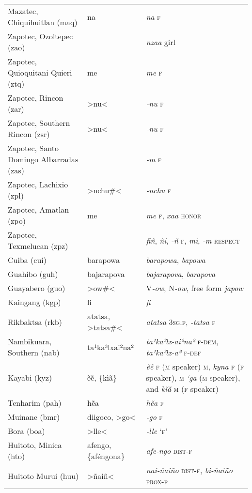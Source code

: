 {\begin{longtable}{L{.25\textwidth}L{.25\textwidth}L{.5\textwidth}}
Mazatec, Chiquihuitlan (maq)	&	na	&	\textit{na} \textsc{f}	\\
Zapotec, Ozoltepec (zao)	&		&	\textit{nzaa} girl	\\
Zapotec, Quioquitani Quieri (ztq)	&	me	&	\textit{me} \textsc{f}	\\
Zapotec, Rincon (zar)	&	>nu<	&	\textit{-nu} \textsc{f}	\\
Zapotec, Southern Rincon (zsr) 	&	>nu<	&	\textit{-nu} \textsc{f}	\\
Zapotec, Santo Domingo Albarradas (zas)	&		&	\textit{-m} \textsc{f}	\\
Zapotec, Lachixio (zpl)	&	>nchu\#<	&	\textit{-nchu} \textsc{f}	\\
Zapotec, Amatlan (zpo)	&	me	&	\textit{me} \textsc{f}, \textit{xaa} \textsc{honor}	\\
Zapotec, Texmelucan (zpz)	&		&	\textit{fiñ}, \textit{ñi}, \textit{-ñ} \textsc{f}, \textit{mi}, \textit{-m} \textsc{respect}	\\
Cuiba (cui)	&	barapowa	&	\textit{barapowa}, \textit{bapowa}	\\
Guahibo (guh)	&	bajarapova	&	\textit{bajarapova}, \textit{barapova}	\\
Guayabero (guo)	&	>ow\#<	&	V\textit{-ow}, N\textit{-ow}, free form \textit{japow}	\\
Kaingang (kgp)	&	fi	&	\textit{fi}	\\
Rikbaktsa (rkb)	&	atatsa, >tatsa\#<	&	\textit{atatsa} \textsc{3sg.f}, \textit{-tatsa} \textsc{f}	\\
Nambikuara, Southern (nab)	&	ta¹ka³lxai²na²	&	\textit{ta¹ka³lx-ai²na²} \textsc{f-dem}, \textit{ta¹ka³lx-a²} \textsc{f-def}	\\
Kayabi (kyz)	&	ẽẽ, \{kĩã\}	&	\textit{ẽẽ} \textsc{f} (\textsc{m} speaker) \textsc{m}, \textit{kyna} \textsc{f} (\textsc{f} speaker), \textsc{m} \textit{‘ga} (\textsc{m} speaker), and \textit{kĩã} \textsc{m} (\textsc{f} speaker)	\\
Tenharim (pah)	&	hẽa	&	\textit{hẽa} \textsc{f}	\\
Muinane (bmr)	&	diigoco, >go<	&	\textit{-go} \textsc{f}	\\
Bora (boa)	&	>lle<	&	\textit{-lle} ‘\textsc{f}’	\\
Huitoto, Minica (hto)	&	afengo, \{aféngona\}	&	\textit{afe-ngo} \textsc{dist-f}	\\
Huitoto Murui (huu)	&	>ñaiñ<	&	\textit{nai-ñaiño} \textsc{dist-f}, \textit{bi-ñaiño} \textsc{prox-f}	\\
\end{longtable}}



